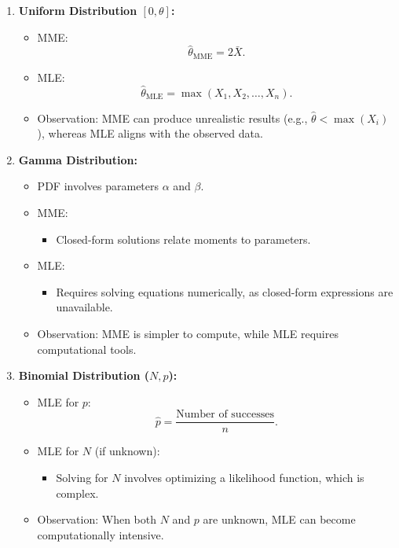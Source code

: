 \documentclass{article}
\begin{document}
\begin{itemize}
\begin{enumerate}
      \item \textbf{Uniform Distribution $[0, \theta]$:}
        \begin{itemize}
          \item MME:
            \[
              \hat{\theta}_{\text{MME}} = 2\bar{X}.
            \]
          \item MLE:
            \[
              \hat{\theta}_{\text{MLE}} = \max(X_1, X_2, \dots, X_n).
            \]
          \item Observation: MME can produce unrealistic results (e.g., $\hat{\theta} < \max(X_i)$), whereas MLE aligns with the observed data.
        \end{itemize}

      \item \textbf{Gamma Distribution:}
        \begin{itemize}
          \item PDF involves parameters $\alpha$ and $\beta$.
          \item MME:
            \begin{itemize}
              \item Closed-form solutions relate moments to parameters.
            \end{itemize}
          \item MLE:
            \begin{itemize}
              \item Requires solving equations numerically, as closed-form expressions are unavailable.
            \end{itemize}
          \item Observation: MME is simpler to compute, while MLE requires computational tools.
        \end{itemize}

      \item \textbf{Binomial Distribution ($N, p$):}
        \begin{itemize}
          \item MLE for $p$:
            \[
              \hat{p} = \frac{\text{Number of successes}}{n}.
            \]
          \item MLE for $N$ (if unknown):
            \begin{itemize}
              \item Solving for $N$ involves optimizing a likelihood function, which is complex.
            \end{itemize}
          \item Observation: When both $N$ and $p$ are unknown, MLE can become computationally intensive.
        \end{itemize}
    \end{enumerate}


\end{itemize}
\end{document}
